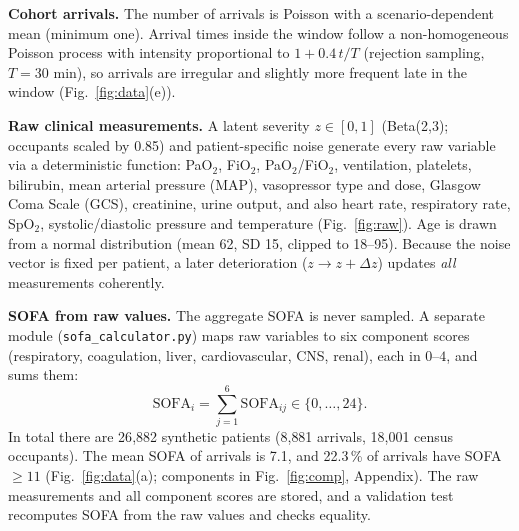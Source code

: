 \documentclass{rlreport}
\begin{document}
\textbf{Cohort arrivals.} The number of arrivals is Poisson with a scenario-dependent mean (minimum one). Arrival times inside the window follow a non-homogeneous Poisson process with intensity proportional to $1+0.4\,t/T$ (rejection sampling, $T=30$ min), so arrivals are irregular and slightly more frequent late in the window (Fig.~\ref{fig:data}(e)).

\textbf{Raw clinical measurements.} A latent severity $z\in[0,1]$ (Beta(2,3); occupants scaled by 0.85) and patient-specific noise generate every raw variable via a deterministic function: PaO$_2$, FiO$_2$, PaO$_2$/FiO$_2$, ventilation, platelets, bilirubin, mean arterial pressure (MAP), vasopressor type and dose, Glasgow Coma Scale (GCS), creatinine, urine output, and also heart rate, respiratory rate, SpO$_2$, systolic/diastolic pressure and temperature (Fig.~\ref{fig:raw}). Age is drawn from a normal distribution (mean 62, SD 15, clipped to 18--95). Because the noise vector is fixed per patient, a later deterioration ($z\to z+\Delta z$) updates \emph{all} measurements coherently.

\textbf{SOFA from raw values.} The aggregate SOFA is never sampled. A separate module (\texttt{sofa\_calculator.py}) maps raw variables to six component scores (respiratory, coagulation, liver, cardiovascular, CNS, renal), each in $0$--$4$, and sums them:
\begin{equation}
  \mathrm{SOFA}_i=\sum_{j=1}^{6}\mathrm{SOFA}_{ij}\in\{0,\dots,24\}.
  \label{eq:sofa}
\end{equation}
In total there are 26{,}882 synthetic patients (8{,}881 arrivals, 18{,}001 census occupants). The mean SOFA of arrivals is 7.1, and 22.3\,\% of arrivals have SOFA $\ge 11$ (Fig.~\ref{fig:data}(a); components in Fig.~\ref{fig:comp}, Appendix). The raw measurements and all component scores are stored, and a validation test recomputes SOFA from the raw values and checks equality.
\end{document}
